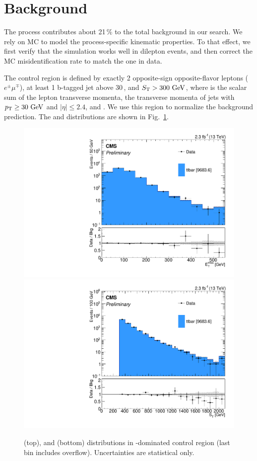 \section{\texorpdfstring{\ttbar}{TTbar} Background}
\label{sec:bkg_tt}

The \ttbar process contributes about 21\,\% to the total background in our search. We rely on MC to model the process-specific kinematic properties. To that effect, we first verify that the simulation works well in dilepton events, and then correct the MC misidentification rate to match the one in data.

The \ttbar control region is defined by exactly 2 opposite-sign opposite-flavor leptons ($e^\pm \mu^\mp$), at least 1 b-tagged jet above 30\,\GeV, and $S_{\mathrm{T}} > 300\,\,\text{Ge\hspace{-.08em}V}$, where \ST is the scalar sum of the lepton transverse momenta, the transverse momenta of jets with $p_{\mathrm{T}} \geq 30\,\,\text{Ge\hspace{-.08em}V}$ and $|\eta| \leq 2.4$, and \MET. We use this region to normalize the background prediction. The \MET and \ST distributions are shown in Fig.~\ref{fig:tt2}.

\begin{figure}
\begin{center}
	\includegraphics[width=.7\textwidth]{Background/bkg_tt/ttbar_MET_STgt300_afterWeights}
	\includegraphics[width=.7\textwidth]{Background/bkg_tt/ttbar_ST_STgt300_afterWeights}
	\caption{\MET (top), and \ST (bottom) distributions in \ttbar-dominated control region (last bin includes overflow). Uncertainties are statistical only.
	\label{fig:tt2}}
\end{center}
\end{figure}

